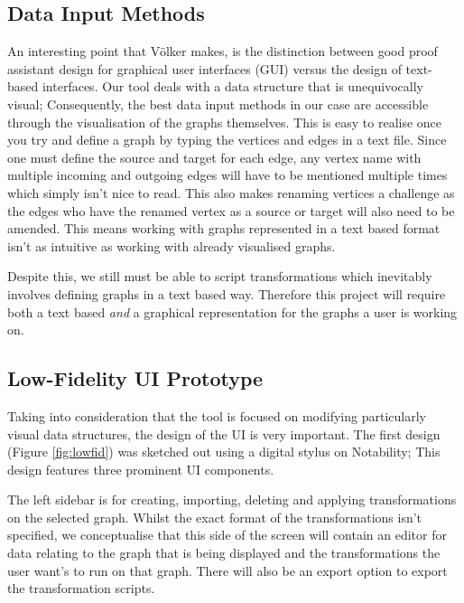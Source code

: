 \documentclass[bsc,frontabs,singlespacing,parskip,deptreport]{infthesis}
\begin{document}
\subsection{Data Input Methods}
An interesting point that V{\"o}lker\cite{volker2004thoughts} makes, is the distinction between good proof assistant design for graphical user interfaces (GUI) versus the design of text-based interfaces. Our tool deals with a data structure that is unequivocally visual; Consequently, the best data input methods in our case are accessible through the visualisation of the graphs themselves. This is easy to realise once you try and define a graph by typing the vertices and edges in a text file. Since one must define the source and target for each edge, any vertex name with multiple incoming and outgoing edges will have to be mentioned multiple times which simply isn't nice to read. This also makes renaming vertices a challenge as the edges who have the renamed vertex as a source or target will also need to be amended. This means working with graphs represented in a text based format isn't as intuitive as working with already visualised graphs. 

Despite this, we still must be able to script transformations which inevitably involves defining graphs in a text based way. Therefore this project will require both a text based \textit{and} a graphical representation for the graphs a user is working on.   




\subsection{Low-Fidelity UI Prototype}
Taking into consideration that the tool is focused on modifying particularly visual data structures, the design of the UI is very important. The first design (Figure \ref{fig:lowfid}) was sketched out using a digital stylus on Notability; This design features three prominent UI components.

The left sidebar is for creating, importing, deleting and applying transformations on the selected graph. Whilst the exact format of the transformations isn't specified, we conceptualise that this side of the screen will contain an editor for data relating to the graph that is being displayed and the transformations the user want's to run on that graph. There will also be an export option to export the transformation scripts. 
\end{document}
